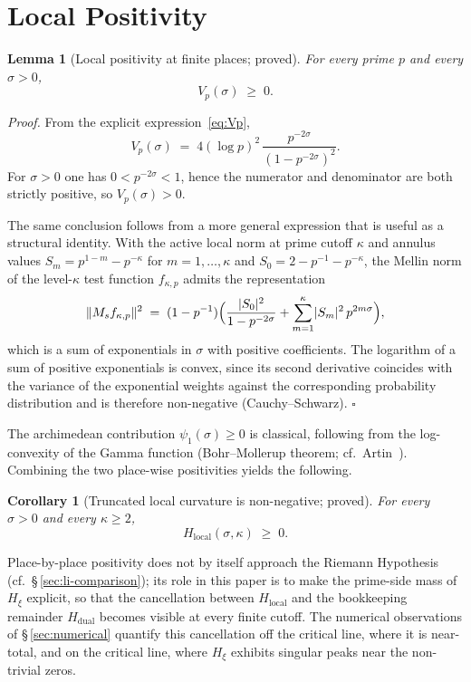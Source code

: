 \documentclass[11pt]{article}
\newtheorem{lemma}[theorem]{Lemma}
\newtheorem{corollary}[theorem]{Corollary}
\newcommand{\Hxi}{H_{\xi}}
\newcommand{\Hlocal}{H_{\mathrm{local}}}
\newcommand{\Hdual}{H_{\mathrm{dual}}}
\begin{document}
\section{Local Positivity}
\label{sec:positivity}

\begin{lemma}[Local positivity at finite places; proved]
\label{lem:Vp-pos}
For every prime $p$ and every $\sigma>0$,
\[
V_p(\sigma)\;\ge\;0.
\]
\end{lemma}

\emph{Proof.}
From the explicit expression~\eqref{eq:Vp},
\[
V_p(\sigma)\;=\;4(\log p)^{2}\,
\frac{p^{-2\sigma}}{(1-p^{-2\sigma})^{2}}.
\]
For $\sigma>0$ one has $0<p^{-2\sigma}<1$, hence the
numerator and denominator are both strictly positive, so
$V_p(\sigma)>0$.

The same conclusion follows from a more general expression
that is useful as a structural identity.
With the active local norm at prime cutoff $\kappa$ and
annulus values
$S_m=p^{1-m}-p^{-\kappa}$ for $m=1,\dots,\kappa$ and
$S_0=2-p^{-1}-p^{-\kappa}$, the Mellin norm of the level-$\kappa$
test function $f_{\kappa,p}$ admits the representation
\[
\lVert M_s f_{\kappa,p}\rVert^{2}
\;=\;(1-p^{-1})\Bigl(\frac{\lvert S_0\rvert^{2}}{1-p^{-2\sigma}}
+\sum_{m=1}^{\kappa}\lvert S_m\rvert^{2}\,p^{2m\sigma}\Bigr),
\]
which is a sum of exponentials in $\sigma$ with positive
coefficients.
The logarithm of a sum of positive exponentials is convex,
since its second derivative coincides with the variance of
the exponential weights against the corresponding probability
distribution and is therefore non-negative
(Cauchy--Schwarz).
\hfill$\square$

\medskip
The archimedean contribution $\psi_1(\sigma)\ge 0$ is
classical, following from the log-convexity of the Gamma
function (Bohr--Mollerup theorem; cf.\ Artin~\cite{Artin}).
Combining the two place-wise positivities yields the
following.

\begin{corollary}[Truncated local curvature is non-negative;
                  proved]
\label{cor:Hlocal-pos}
For every $\sigma>0$ and every $\kappa\ge 2$,
\[
\Hlocal(\sigma,\kappa)\;\ge\;0.
\]
\end{corollary}

\medskip
Place-by-place positivity does not by itself approach the
Riemann Hypothesis (cf.\ \S\,\ref{sec:li-comparison}); its
role in this paper is to make the prime-side mass of $\Hxi$
explicit, so that the cancellation between $\Hlocal$ and the
bookkeeping remainder $\Hdual$ becomes visible at every finite
cutoff.
The numerical observations of \S\,\ref{sec:numerical}
quantify this cancellation off the critical line, where it is
near-total, and on the critical line, where $\Hxi$ exhibits
singular peaks near the non-trivial zeros.
\end{document}
